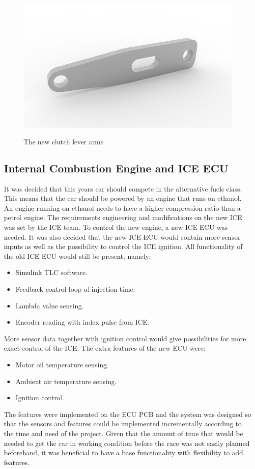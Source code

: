 \begin{figure}[H]
    \centering\label{fig:clutch}
    \includegraphics[width=1\textwidth]{./img/clutch}
    \caption{The new clutch lever arms}
\end{figure}

\subsection{Internal Combustion Engine and ICE ECU}
It was decided that this years car should compete in the alternative fuels
class. This means that the car should be powered by an engine that runs on
ethanol. An engine running on ethanol needs to have a higher compression ratio than
a petrol engine.
The requirements engineering and modifications on the new ICE was set by the ICE
team. To control the new engine, a new ICE ECU was needed. It was also decided
that the new ICE ECU would contain more sensor inputs as well as the possibility
to control the ICE ignition. All functionality of the old ICE ECU would still be
present, namely:
\begin{itemize}
    \item Simulink TLC software.
    \item Feedback control loop of injection time.
    \item Lambda value sensing.
    \item Encoder reading with index pulse from ICE\@.
\end{itemize}
More sensor data together with ignition control would give possibilities
for more exact control of the ICE\@. The extra features of the new ECU were:
\begin{itemize}
    \item Motor oil temperature sensing.
    \item Ambient air temperature sensing.
    \item Ignition control.
\end{itemize}
The features were implemented on the ECU PCB and the system was designed so that
the sensors and features could be implemented incrementally according to the
time and need of the project. Given that the amount of time that would be needed
to get the car in working condition before the race was not easily planned
beforehand, it was beneficial to have a base functionality with flexibility to
add features.

